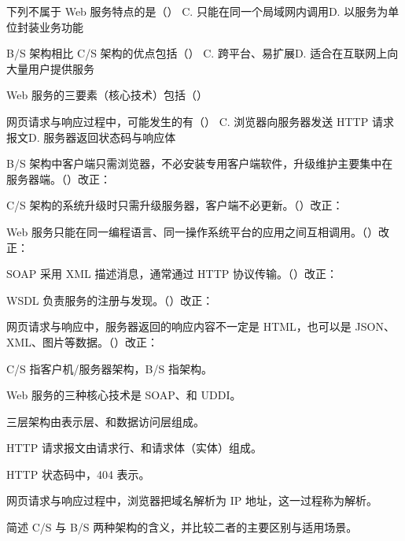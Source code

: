 \documentclass[a4paper,11pt]{article}
\begin{document}
\q 下列不属于 Web 服务特点的是（\quad）
{C. 只能在同一个局域网内调用}{D. 以服务为单位封装业务功能}

\q B/S 架构相比 C/S 架构的优点包括（\quad）
{C. 跨平台、易扩展}{D. 适合在互联网上向大量用户提供服务}

\q Web 服务的三要素（核心技术）包括（\quad）

\q 网页请求与响应过程中，可能发生的有（\quad）
{C. 浏览器向服务器发送 HTTP 请求报文}{D. 服务器返回状态码与响应体}

\q B/S 架构中客户端只需浏览器，不必安装专用客户端软件，升级维护主要集中在服务器端。\quad（\quad）\quad 改正：\fixblank

\q C/S 架构的系统升级时只需升级服务器，客户端不必更新。\quad（\quad）\quad 改正：\fixblank

\q Web 服务只能在同一编程语言、同一操作系统平台的应用之间互相调用。\quad（\quad）\quad 改正：\fixblank

\q SOAP 采用 XML 描述消息，通常通过 HTTP 协议传输。\quad（\quad）\quad 改正：\fixblank

\q WSDL 负责服务的注册与发现。\quad（\quad）\quad 改正：\fixblank

\q 网页请求与响应中，服务器返回的响应内容不一定是 HTML，也可以是 JSON、XML、图片等数据。\quad（\quad）\quad 改正：\fixblank

\q C/S 指客户机/服务器架构，B/S 指\fillblanks[3.4cm]架构。

\q Web 服务的三种核心技术是 SOAP、\fillblanks[1.8cm]和 UDDI。

\q 三层架构由表示层、\fillblanks[2.6cm]和数据访问层组成。

\q HTTP 请求报文由请求行、\fillblanks[1.8cm]和请求体（实体）组成。

\q HTTP 状态码中，404 表示\fillblanks[2.8cm]。

\q 网页请求与响应过程中，浏览器把域名解析为 IP 地址，这一过程称为\fillblanks[2.2cm]解析。

\q 简述 C/S 与 B/S 两种架构的含义，并比较二者的主要区别与适用场景。\anslines{2.4cm}
\end{document}
